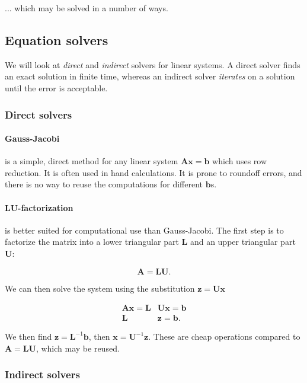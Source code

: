 ... which may be solved in a number of ways.

\subsection{Equation solvers}
We will look at \emph{direct} and \emph{indirect} solvers for linear systems. A direct solver finds an exact solution in finite time, whereas an indirect solver \emph{iterates} on a solution until the error is acceptable.

\subsubsection{Direct solvers}
\paragraph*{Gauss-Jacobi} is a simple, direct method for any linear system $\mathbf{A}\mathbf{x} = \mathbf{b}$ which uses row reduction. It is often used in hand calculations. It is prone to roundoff errors, and there is no way to reuse the computations for different $\mathbf{b}$s. 

\paragraph*{LU-factorization} is better suited for computational use than Gauss-Jacobi. The first step is to factorize the matrix into a lower triangular part $\mathbf{L}$ and an upper triangular part $\mathbf{U}$:

\begin{equation}
  \mathbf{A} = \mathbf{L} \mathbf{U}.
\end{equation}

We can then solve the system using the substitution $\mathbf{z} = \mathbf{U} \mathbf{x}$

\begin{align}
  \mathbf{A} \mathbf{x} = \mathbf{L} &\mathbf{U} \mathbf{x} = \mathbf{b} \\
  \mathbf{L} &\mathbf{z} = \mathbf{b}.
\end{align}

We then find $\mathbf{z} = \mathbf{L}^{-1} \mathbf{b}$, then $\mathbf{x} = \mathbf{U}^{-1} \mathbf{z}$. These are cheap operations compared to $\mathbf{A} = \mathbf{L} \mathbf{U}$, which may be reused.

\subsubsection{Indirect solvers}

